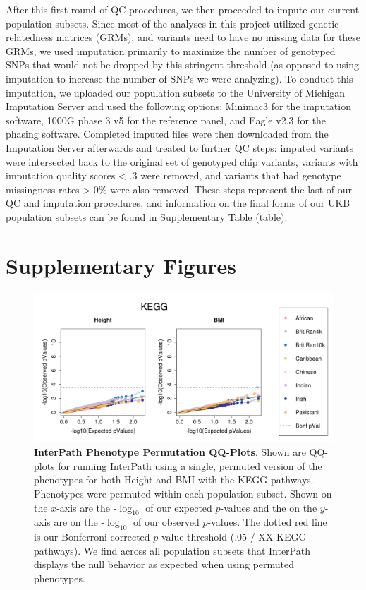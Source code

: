 \documentclass[12pt, a4paper]{article}
\begin{document}
After this first round of QC procedures, we then proceeded to impute our current population subsets. Since most of the analyses in this project utilized genetic relatedness matrices (GRMs), and variants need to have no missing data for these GRMs, we used imputation primarily to maximize the number of genotyped SNPs that would not be dropped by this stringent threshold (as opposed to using imputation to increase the number of SNPs we were analyzing). To conduct this imputation, we uploaded our population subsets to the University of Michigan Imputation Server \citep{Das2016} and used the following options: Minimac3 for the imputation software, 1000G phase 3 v5 for the reference panel, and Eagle v2.3 for the phasing software. Completed imputed files were then downloaded from the Imputation Server afterwards and treated to further QC steps: imputed variants were intersected back to the original set of genotyped chip variants, variants with imputation quality scores < .3 were removed, and variants that had genotype missingness rates > 0\% were also removed. These steps represent the last of our QC and imputation procedures, and information on the final forms of our UKB population subsets can be found in Supplementary Table (table).

\section{Supplementary Figures}\label{Supplementary-Figures}

\begin{figure}[htbp]
\centering
\includegraphics[scale=.35]{Images/Supp/InterPath_Supp_Figure_QQPlots_KEGG_vs1.png}
\caption[TBD]{\textbf{InterPath Phenotype Permutation QQ-Plots}. Shown are QQ-plots for running InterPath using a single, permuted version of the phenotypes for both Height and BMI with the KEGG pathways. Phenotypes were permuted within each population subset. Shown on the $x$-axis are the -$\log_{10}$ of our expected $p$-values and the on the $y$-axis are on the -$\log_{10}$ of our observed $p$-values. The dotted red line is our Bonferroni-corrected $p$-value threshold (.05 / XX KEGG pathways). We find across all population subsets that InterPath displays the null behavior as expected when using permuted phenotypes.}
\label{InterPath-Suppl-Figure-QQPlots-KEGG}
\end{figure}
\end{document}
